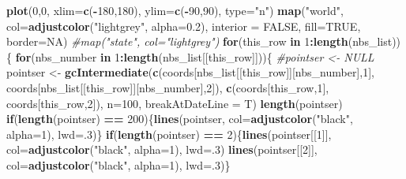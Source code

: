 \documentclass[]{book}
\newenvironment{Shaded}{\begin{snugshade}}{\end{snugshade}}
\newcommand{\KeywordTok}[1]{\textcolor[rgb]{0.13,0.29,0.53}{\textbf{{#1}}}}
\newcommand{\DataTypeTok}[1]{\textcolor[rgb]{0.13,0.29,0.53}{{#1}}}
\newcommand{\DecValTok}[1]{\textcolor[rgb]{0.00,0.00,0.81}{{#1}}}
\newcommand{\FloatTok}[1]{\textcolor[rgb]{0.00,0.00,0.81}{{#1}}}
\newcommand{\StringTok}[1]{\textcolor[rgb]{0.31,0.60,0.02}{{#1}}}
\newcommand{\CommentTok}[1]{\textcolor[rgb]{0.56,0.35,0.01}{\textit{{#1}}}}
\newcommand{\OtherTok}[1]{\textcolor[rgb]{0.56,0.35,0.01}{{#1}}}
\newcommand{\ControlFlowTok}[1]{\textcolor[rgb]{0.13,0.29,0.53}{\textbf{{#1}}}}
\newcommand{\OperatorTok}[1]{\textcolor[rgb]{0.81,0.36,0.00}{\textbf{{#1}}}}
\newcommand{\NormalTok}[1]{{#1}}
\theoremstyle{definition}
\theoremstyle{definition}
\theoremstyle{definition}
\theoremstyle{remark}
\begin{document}
\begin{Shaded}
\begin{Highlighting}[]
\KeywordTok{plot}\NormalTok{(}\DecValTok{0}\NormalTok{,}\DecValTok{0}\NormalTok{, }\DataTypeTok{xlim=}\KeywordTok{c}\NormalTok{(}\OperatorTok{-}\DecValTok{180}\NormalTok{,}\DecValTok{180}\NormalTok{), }\DataTypeTok{ylim=}\KeywordTok{c}\NormalTok{(}\OperatorTok{-}\DecValTok{90}\NormalTok{,}\DecValTok{90}\NormalTok{), }\DataTypeTok{type=}\StringTok{"n"}\NormalTok{)}
\KeywordTok{map}\NormalTok{(}\StringTok{"world"}\NormalTok{, }\DataTypeTok{col=}\KeywordTok{adjustcolor}\NormalTok{(}\StringTok{"lightgrey"}\NormalTok{, }\DataTypeTok{alpha=}\FloatTok{0.2}\NormalTok{), }\DataTypeTok{interior =} \OtherTok{FALSE}\NormalTok{, }\DataTypeTok{fill=}\OtherTok{TRUE}\NormalTok{, }\DataTypeTok{border=}\OtherTok{NA}\NormalTok{)}
\CommentTok{#map("state", col="lightgrey")}
\ControlFlowTok{for}\NormalTok{(this_row }\ControlFlowTok{in} \DecValTok{1}\OperatorTok{:}\KeywordTok{length}\NormalTok{(nbs_list))\{}
\ControlFlowTok{for}\NormalTok{(nbs_number }\ControlFlowTok{in} \DecValTok{1}\OperatorTok{:}\KeywordTok{length}\NormalTok{(nbs_list[[this_row]]))\{}
\CommentTok{#pointser <- NULL}
\NormalTok{pointser <-}\StringTok{ }\KeywordTok{gcIntermediate}\NormalTok{(}\KeywordTok{c}\NormalTok{(coords[nbs_list[[this_row]][nbs_number],}\DecValTok{1}\NormalTok{], coords[nbs_list[[this_row]][nbs_number],}\DecValTok{2}\NormalTok{]), }\KeywordTok{c}\NormalTok{(coords[this_row,}\DecValTok{1}\NormalTok{], coords[this_row,}\DecValTok{2}\NormalTok{]), }\DataTypeTok{n=}\DecValTok{100}\NormalTok{, }\DataTypeTok{breakAtDateLine =}\NormalTok{ T)}
    \KeywordTok{length}\NormalTok{(pointser)}
        \ControlFlowTok{if}\NormalTok{(}\KeywordTok{length}\NormalTok{(pointser) }\OperatorTok{==}\StringTok{ }\DecValTok{200}\NormalTok{)\{}\KeywordTok{lines}\NormalTok{(pointser, }\DataTypeTok{col=}\KeywordTok{adjustcolor}\NormalTok{(}\StringTok{"black"}\NormalTok{, }\DataTypeTok{alpha=}\DecValTok{1}\NormalTok{), }\DataTypeTok{lwd=}\NormalTok{.}\DecValTok{3}\NormalTok{)\}}
\ControlFlowTok{if}\NormalTok{(}\KeywordTok{length}\NormalTok{(pointser) }\OperatorTok{==}\StringTok{ }\DecValTok{2}\NormalTok{)\{}\KeywordTok{lines}\NormalTok{(pointser[[}\DecValTok{1}\NormalTok{]], }\DataTypeTok{col=}\KeywordTok{adjustcolor}\NormalTok{(}\StringTok{"black"}\NormalTok{, }\DataTypeTok{alpha=}\DecValTok{1}\NormalTok{), }\DataTypeTok{lwd=}\NormalTok{.}\DecValTok{3}\NormalTok{)}
    \KeywordTok{lines}\NormalTok{(pointser[[}\DecValTok{2}\NormalTok{]], }\DataTypeTok{col=}\KeywordTok{adjustcolor}\NormalTok{(}\StringTok{"black"}\NormalTok{, }\DataTypeTok{alpha=}\DecValTok{1}\NormalTok{), }\DataTypeTok{lwd=}\NormalTok{.}\DecValTok{3}\NormalTok{)\}}
    

\end{Highlighting}
\end{Shaded}
\end{document}
